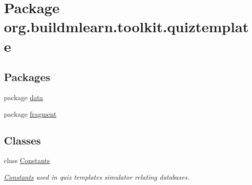 \hypertarget{namespaceorg_1_1buildmlearn_1_1toolkit_1_1quiztemplate}{}\section{Package org.\+buildmlearn.\+toolkit.\+quiztemplate}
\label{namespaceorg_1_1buildmlearn_1_1toolkit_1_1quiztemplate}
\subsection*{Packages}
\begin{DoxyCompactItemize}
\item 
package \hyperlink{namespaceorg_1_1buildmlearn_1_1toolkit_1_1quiztemplate_1_1data}{data}
\item 
package \hyperlink{namespaceorg_1_1buildmlearn_1_1toolkit_1_1quiztemplate_1_1fragment}{fragment}
\end{DoxyCompactItemize}
\subsection*{Classes}
\begin{DoxyCompactItemize}
\item 
class \hyperlink{classorg_1_1buildmlearn_1_1toolkit_1_1quiztemplate_1_1Constants}{Constants}
\begin{DoxyCompactList}\small\item\em \hyperlink{classorg_1_1buildmlearn_1_1toolkit_1_1quiztemplate_1_1Constants}{Constants} used in quiz template\textquotesingle{}s simulator relating databases. \end{DoxyCompactList}\end{DoxyCompactItemize}

